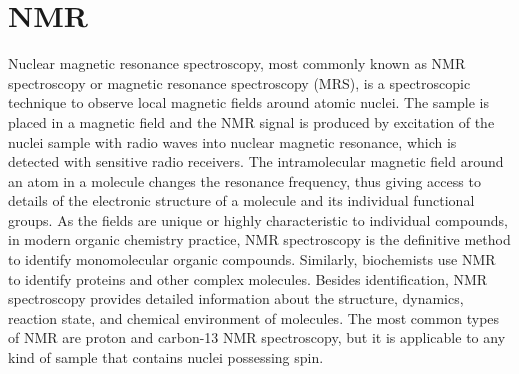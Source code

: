 \documentclass[book.tex]{subfiles}
\begin{document}
\section{NMR}
Nuclear magnetic resonance spectroscopy, most commonly known as NMR spectroscopy or magnetic resonance spectroscopy (MRS), is a spectroscopic technique to observe local magnetic fields around atomic nuclei. The sample is placed in a magnetic field and the NMR signal is produced by excitation of the nuclei sample with radio waves into nuclear magnetic resonance, which is detected with sensitive radio receivers. The intramolecular magnetic field around an atom in a molecule changes the resonance frequency, thus giving access to details of the electronic structure of a molecule and its individual functional groups. As the fields are unique or highly characteristic to individual compounds, in modern organic chemistry practice, NMR spectroscopy is the definitive method to identify monomolecular organic compounds. Similarly, biochemists use NMR to identify proteins and other complex molecules. Besides identification, NMR spectroscopy provides detailed information about the structure, dynamics, reaction state, and chemical environment of molecules. The most common types of NMR are proton and carbon-13 NMR spectroscopy, but it is applicable to any kind of sample that contains nuclei possessing spin.
\end{document}
